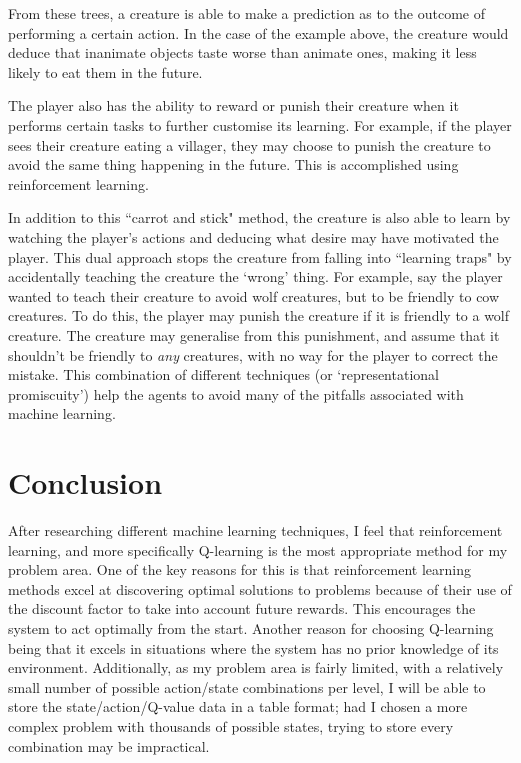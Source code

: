 \documentclass[a4paper,oneside]{report}
\begin{document}
From these trees, a creature is able to make a prediction as to the outcome of performing a certain action. In the case of the example above, the creature would deduce that inanimate objects taste worse than animate ones, making it less likely to eat them in the future. 

The player also has the ability to reward or punish their creature when it performs certain tasks to further customise its learning. For example, if the player sees their creature eating a villager, they may choose to punish the creature to avoid the same thing happening in the future. This is accomplished using reinforcement learning. 

In addition to this ``carrot and stick" method, the creature is also able to learn by watching the player's actions and deducing what desire may have motivated the player. This dual approach stops the creature from falling into ``learning traps" by accidentally teaching the creature the `wrong' thing. For example, say the player wanted to teach their creature to avoid wolf creatures, but to be friendly to cow creatures. To do this, the player may punish the creature if it is friendly to a wolf creature. The creature may generalise from this punishment, and assume that it shouldn't be friendly to \emph{any} creatures, with no way for the player to correct the mistake. This combination of different techniques (or `representational promiscuity') help the agents to avoid many of the pitfalls associated with machine learning.

\section{Conclusion}

After researching different machine learning techniques, I feel that reinforcement learning, and more specifically Q-learning is the most appropriate method for my problem area. One of the key reasons for this is that reinforcement learning methods excel at discovering optimal solutions to problems because of their use of the discount factor to take into account future rewards. This encourages the system to act optimally from the start. Another reason for choosing Q-learning being that it excels in situations where the system has no prior knowledge of its environment. Additionally, as my problem area is fairly limited, with a relatively small number of possible action/state combinations per level, I will be able to store the state/action/Q-value data in a table format; had I chosen a more complex problem with thousands of possible states, trying to store every combination may be impractical.
\end{document}
